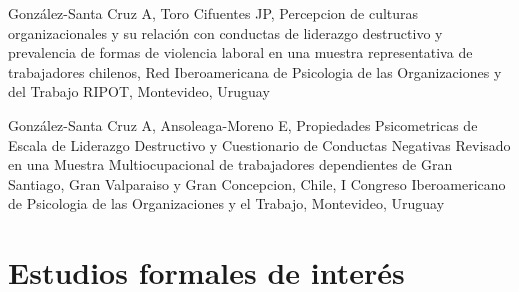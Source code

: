 \documentclass[11pt,a4paper,]{awesome-cv}
\begin{document}
\begin{cventries}
{\begin{cvitems}
\item González-Santa Cruz A, Toro Cifuentes JP, Percepcion de culturas organizacionales y su relación con conductas de liderazgo destructivo y prevalencia de formas de violencia laboral en una muestra representativa de trabajadores chilenos, Red Iberoamericana de Psicologia de las Organizaciones y del Trabajo RIPOT, Montevideo, Uruguay
\item González-Santa Cruz A, Ansoleaga-Moreno E, Propiedades Psicometricas de Escala de Liderazgo Destructivo y Cuestionario de Conductas Negativas Revisado en una Muestra Multiocupacional de trabajadores dependientes de Gran Santiago, Gran Valparaiso y Gran Concepcion, Chile, I Congreso Iberoamericano de Psicologia de las Organizaciones y el Trabajo, Montevideo, Uruguay
\end{cvitems}}
\end{cventries}

\hypertarget{estudios-formales-de-interuxe9s-1}{%
\section{Estudios formales de
interés}\label{estudios-formales-de-interuxe9s-1}}

\fontsize{9.5pt}{1.2em}\color{text}
\begin{cventries}
    \vspace{-4.0mm}
    \vspace{-4.0mm}
    \vspace{-4.0mm}
    \vspace{-4.0mm}
    \vspace{-4.0mm}
\end{cventries}

\pagebreak

\linebreak
\end{document}
